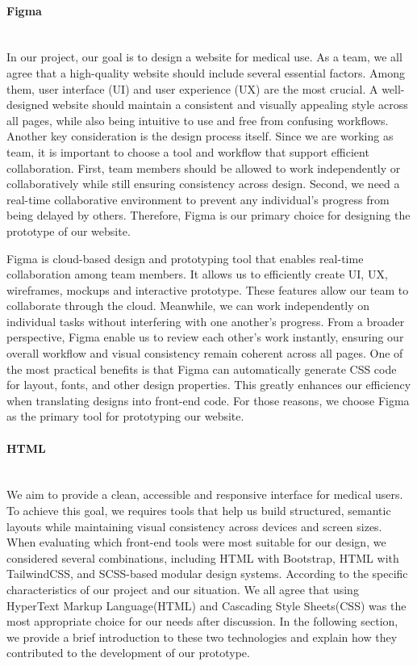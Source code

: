 %
%

\paragraph{Figma}\mbox{}\\

In our project, our goal is to design a website for medical use. As a team, we all agree that a high-quality website should include several essential factors. Among them, user interface (UI) and user experience (UX) are the most crucial. A well-designed website should maintain a consistent and visually appealing style across all pages, while also being intuitive to use and free from confusing workflows. Another key consideration is the design process itself. Since we are working as team, it is important to choose a tool and workflow that support efficient collaboration. First, team members should be allowed to work independently or collaboratively while still ensuring consistency across design. Second, we need a real-time collaborative environment to prevent any individual’s progress from being delayed by others. Therefore, Figma is our primary choice for designing the prototype of our website.

Figma is cloud-based design and prototyping tool that enables real-time collaboration among team members. It allows us to efficiently create UI, UX, wireframes, mockups and interactive prototype. These features allow our team to collaborate through the cloud. Meanwhile, we can work independently on individual tasks without interfering with one another’s progress. From a broader perspective, Figma enable us to review each other’s work instantly, ensuring our overall workflow and visual consistency remain coherent across all pages. One of the most practical benefits is that Figma can automatically generate CSS code for layout, fonts, and other design properties. This greatly enhances our efficiency when translating designs into front-end code. For those reasons, we choose Figma as the primary tool for prototyping our website.

\paragraph{HTML}\mbox{}\\

We aim to provide a clean, accessible and responsive interface for medical users. To achieve this goal, we requires tools that help us build structured, semantic layouts while maintaining visual consistency across devices and screen sizes. When evaluating which front-end tools were most suitable for our design, we considered several combinations, including HTML with Bootstrap, HTML with TailwindCSS, and SCSS-based modular design systems. According to the specific characteristics of our project and our situation. We all agree that using HyperText Markup Language(HTML) and Cascading Style Sheets(CSS) was the most appropriate choice for our needs after discussion. In the following section, we provide a brief introduction to these two technologies and explain how they contributed to the development of our prototype.

